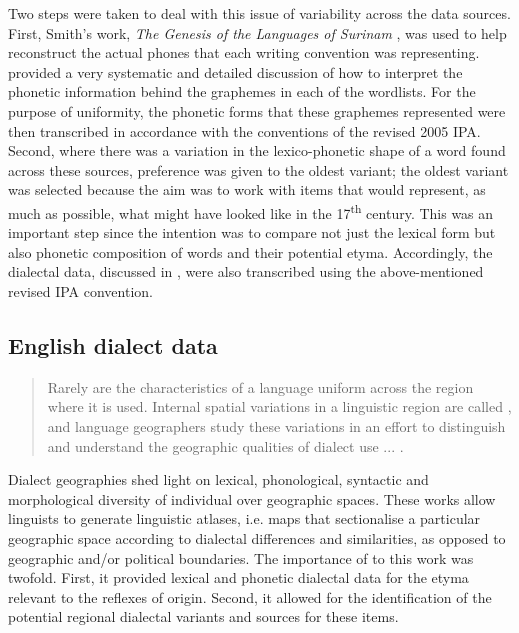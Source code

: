 Two steps were taken to deal with this issue of variability across the  data sources. First, Smith's   work, \emph{The Genesis of the  Languages of Surinam} \citep{Smith87}, was used to help reconstruct the actual phones that each writing convention was representing. \citet{Smith87} provided a very systematic and detailed discussion of how to interpret the phonetic information behind the graphemes in each of the wordlists. For the purpose of uniformity, the phonetic forms that these graphemes represented were then transcribed in accordance with the conventions of the revised 2005 IPA. Second, where there was a variation in the lexico-phonetic shape of a word found across these sources, preference was given to the oldest variant; the oldest variant was selected because the aim was to work with items that would represent, as much as possible, what  might have looked like in the 17\textsuperscript{th} century. This was an important step since the intention was to compare not just the lexical form but also phonetic composition of  words and their potential  etyma. Accordingly, the  dialectal data, discussed in , were also transcribed using the above-mentioned revised IPA convention.

\subsection{English dialect data} \label{3.2.2}
\begin{quote}
Rarely are the characteristics of a language uniform across the region where it is used. Internal spatial variations in a linguistic region are called , and language geographers study these variations in an effort to distinguish and understand the geographic qualities of dialect use ... \citep[209]{Hanks11}.
\end{quote}

Dialect geographies shed light on lexical, phonological, syntactic and morphological diversity of individual  over geographic spaces. These works allow linguists to generate linguistic atlases, i.e. maps that sectionalise a particular geographic space according to dialectal differences and similarities, as opposed to geographic and/or political boundaries. The importance of   to this work was twofold. First, it provided lexical and phonetic dialectal data for the  etyma relevant to the  reflexes of  origin. Second, it allowed for the identification of the potential regional dialectal variants and sources for these items.


